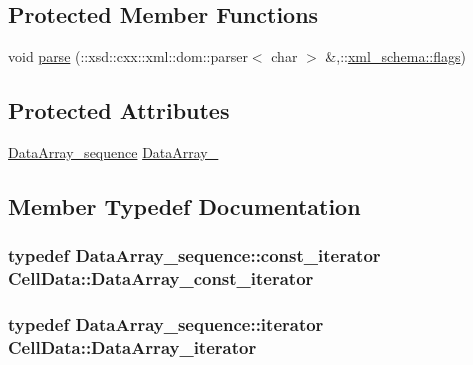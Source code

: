 \subsection*{Protected Member Functions}
\begin{DoxyCompactItemize}
\item 
void \hyperlink{classCellData_a85b0468d603457e811156927cb35a3fa}{parse} (\+::xsd\+::cxx\+::xml\+::dom\+::parser$<$ char $>$ \&,\+::\hyperlink{namespacexml__schema_a0612287d030cb2732d31a45b258fdc87}{xml\+\_\+schema\+::flags})
\end{DoxyCompactItemize}
\subsection*{Protected Attributes}
\begin{DoxyCompactItemize}
\item 
\hyperlink{classCellData_a52b0c8e18ccdb06ed9e6ae76cd809c4a}{Data\+Array\+\_\+sequence} \hyperlink{classCellData_a6dc3acb849afce77fd961dbcabaa9252}{Data\+Array\+\_\+}
\end{DoxyCompactItemize}


\subsection{Member Typedef Documentation}
\subsubsection[{\texorpdfstring{Data\+Array\+\_\+const\+\_\+iterator}{DataArray_const_iterator}}]{\setlength{\rightskip}{0pt plus 5cm}typedef Data\+Array\+\_\+sequence\+::const\+\_\+iterator {\bf Cell\+Data\+::\+Data\+Array\+\_\+const\+\_\+iterator}}\hypertarget{classCellData_a8213ea10f002fac23b5555ca0b2b2a21}{}\label{classCellData_a8213ea10f002fac23b5555ca0b2b2a21}
\subsubsection[{\texorpdfstring{Data\+Array\+\_\+iterator}{DataArray_iterator}}]{\setlength{\rightskip}{0pt plus 5cm}typedef Data\+Array\+\_\+sequence\+::iterator {\bf Cell\+Data\+::\+Data\+Array\+\_\+iterator}}\hypertarget{classCellData_abe0f5b0713690cc81703132bcdccd51f}{}\label{classCellData_abe0f5b0713690cc81703132bcdccd51f}
